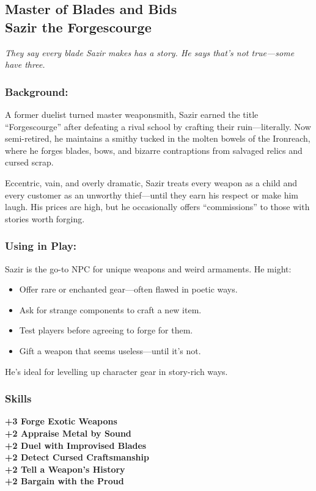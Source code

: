 \subsection{{\small Master of Blades and Bids}\\ Sazir the Forgescourge}
\label{npc:sazir-forgescourge}

\emph{They say every blade Sazir makes has a story. He says that's not true—some have three.}
\vspace{.5\baselineskip}

\begin{paracol}{3}
    \subsubsection*{Background:}
    A former duelist turned master weaponsmith, Sazir earned the title “Forgescourge” after defeating a rival school by crafting their ruin—literally. Now semi-retired, he maintains a smithy tucked in the molten bowels of the Ironreach, where he forges blades, bows, and bizarre contraptions from salvaged relics and cursed scrap.

    Eccentric, vain, and overly dramatic, Sazir treats every weapon as a child and every customer as an unworthy thief—until they earn his respect or make him laugh. His prices are high, but he occasionally offers “commissions” to those with stories worth forging.

    \switchcolumn
    \subsubsection*{Using in Play:}
    Sazir is the go-to NPC for unique weapons and weird armaments. He might:
    \begin{itemize}
        \item Offer rare or enchanted gear—often flawed in poetic ways.
        \item Ask for strange components to craft a new item.
        \item Test players before agreeing to forge for them.
        \item Gift a weapon that seems useless—until it's not.
    \end{itemize}

    He's ideal for levelling up character gear in story-rich ways.

    \switchcolumn
    \subsubsection{Skills}
        \noindent\textbf{+3 Forge Exotic Weapons} \\
        \noindent\textbf{+2 Appraise Metal by Sound} \\
        \noindent\textbf{+2 Duel with Improvised Blades} \\
        \noindent\textbf{+2 Detect Cursed Craftsmanship} \\
        \noindent\textbf{+2 Tell a Weapon’s History} \\
        \noindent\textbf{+2 Bargain with the Proud}

\end{paracol}
